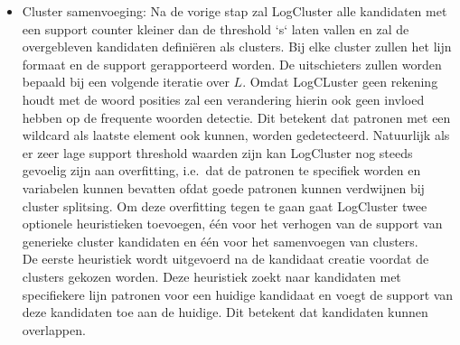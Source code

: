 \begin{itemize}
    \item Cluster samenvoeging: Na de vorige stap zal LogCluster alle kandidaten met een support counter kleiner dan de threshold `s` laten vallen en zal de overgebleven kandidaten definiëren als clusters. Bij elke cluster zullen het lijn formaat en de support gerapporteerd worden. De uitschieters zullen worden bepaald bij een volgende iteratie over $L$. Omdat LogCLuster geen rekening houdt met de woord posities zal een verandering hierin ook geen invloed hebben op de frequente woorden detectie. Dit betekent dat patronen met een wildcard als laatste element ook kunnen, worden gedetecteerd. Natuurlijk als er zeer lage support threshold waarden zijn kan LogCluster nog steeds gevoelig zijn aan overfitting, i.e.\ dat de patronen te specifiek worden en variabelen kunnen bevatten ofdat goede patronen kunnen verdwijnen bij cluster splitsing. Om deze overfitting tegen te gaan gaat LogCluster twee optionele heuristieken toevoegen, één voor het verhogen van de support van generieke cluster kandidaten en één voor het samenvoegen van clusters.\\
    
    \subitem De eerste heuristiek wordt uitgevoerd na de kandidaat creatie voordat de clusters gekozen worden. Deze heuristiek zoekt naar kandidaten met specifiekere lijn patronen voor een huidige kandidaat en voegt de support van deze kandidaten toe aan de huidige. Dit betekent dat kandidaten kunnen overlappen.\\
    

\end{itemize}
